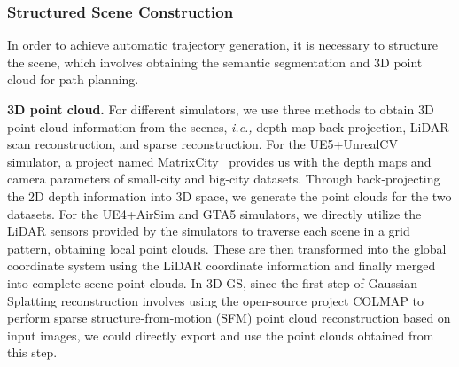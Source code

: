 \subsubsection{Structured Scene Construction}
\indent \indent In order to achieve automatic trajectory generation, it is necessary to structure the scene, which involves obtaining the semantic segmentation and 3D point cloud for path planning.


\textbf{3D point cloud.} 
For different simulators, we use three methods to obtain 3D point cloud information from the scenes, \emph{i.e.,} depth map back-projection, LiDAR scan reconstruction, and sparse reconstruction. For the UE5+UnrealCV simulator, a project named MatrixCity~\cite{li2023matrixcity} provides us with the depth maps and camera parameters of small-city and big-city datasets. Through back-projecting the 2D depth information into 3D space, we generate the point clouds for the two datasets. For the UE4+AirSim and GTA5 simulators, we directly utilize the LiDAR sensors provided by the simulators to traverse each scene in a grid pattern, obtaining local point clouds. These are then transformed into the global coordinate system using the LiDAR coordinate information and finally merged into complete scene point clouds. In 3D GS, since the first step of Gaussian Splatting reconstruction involves using the open-source project COLMAP \cite{colmap} to perform sparse structure-from-motion (SFM) point cloud reconstruction based on input images, we could directly export and use the point clouds obtained from this step.

